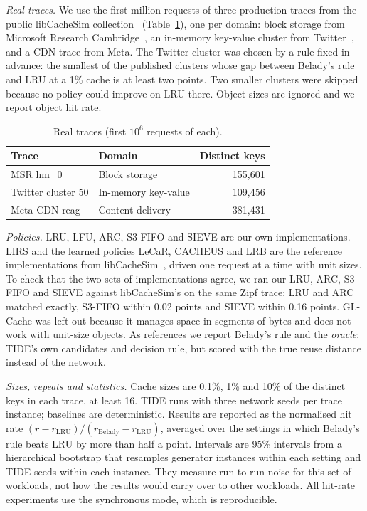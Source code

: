 \documentclass{llncs}
\begin{document}
\emph{Real traces.} We use the first million requests of three production traces from the public libCacheSim collection~\cite{libcachesim} (Table~\ref{tab:real-traces}), one per domain: block storage from Microsoft Research Cambridge~\cite{narayanan2008}, an in-memory key-value cluster from Twitter~\cite{yang2020twitter}, and a CDN trace from Meta. The Twitter cluster was chosen by a rule fixed in advance: the smallest of the published clusters whose gap between Belady's rule and LRU at a 1\% cache is at least two points. Two smaller clusters were skipped because no policy could improve on LRU there. Object sizes are ignored and we report object hit rate.

\begin{table}[htbp]
\centering
\caption{Real traces (first $10^6$ requests of each).}
\label{tab:real-traces}
\begin{tabular}{llr}
\toprule
Trace & Domain & Distinct keys \\
\midrule
MSR hm\_0 & Block storage & 155,601 \\
Twitter cluster 50 & In-memory key-value & 109,456 \\
Meta CDN reag & Content delivery & 381,431 \\
\bottomrule
\end{tabular}
\end{table}

\emph{Policies.} LRU, LFU, ARC, S3-FIFO and SIEVE are our own implementations. LIRS and the learned policies LeCaR, CACHEUS and LRB are the reference implementations from libCacheSim~\cite{libcachesim}, driven one request at a time with unit sizes. To check that the two sets of implementations agree, we ran our LRU, ARC, S3-FIFO and SIEVE against libCacheSim's on the same Zipf trace: LRU and ARC matched exactly, S3-FIFO within 0.02 points and SIEVE within 0.16 points. GL-Cache was left out because it manages space in segments of bytes and does not work with unit-size objects. As references we report Belady's rule and the \emph{oracle}: TIDE's own candidates and decision rule, but scored with the true reuse distance instead of the network.

\emph{Sizes, repeats and statistics.} Cache sizes are 0.1\%, 1\% and 10\% of the distinct keys in each trace, at least 16. TIDE runs with three network seeds per trace instance; baselines are deterministic. Results are reported as the normalised hit rate $(r - r_\mathrm{LRU})/(r_\mathrm{Belady} - r_\mathrm{LRU})$, averaged over the settings in which Belady's rule beats LRU by more than half a point. Intervals are 95\% intervals from a hierarchical bootstrap that resamples generator instances within each setting and TIDE seeds within each instance. They measure run-to-run noise for this set of workloads, not how the results would carry over to other workloads. All hit-rate experiments use the synchronous mode, which is reproducible.
\end{document}
